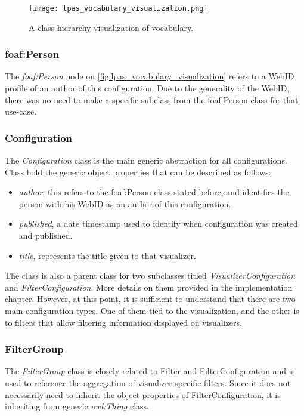 \begin{figure}[h]
\centering
\texttt{[image: lpas\_vocabulary\_visualization.png]}
\caption{A class hierarchy visualization of \lpa{} vocabulary.}
\label{fig:lpas_vocabulary_visualization}
\end{figure}

\subsubsection{foaf:Person}

The \textit{foaf:Person} node on \autoref{fig:lpas_vocabulary_visualization} refers to a WebID profile of an author of this configuration. Due to the generality of the WebID, there was no need to make a specific subclass from the foaf:Person class for that use-case.

\subsubsection{Configuration}

The \textit{Configuration} class is the main generic abstraction for all \lpa{} configurations. Class hold the generic object properties that can be described as follows:
\begin{itemize}
	\item \textit{author}, this refers to the foaf:Person class stated before, and identifies the person with his WebID as an author of this \lpa{} configuration.
	\item \textit{published}, a date timestamp used to identify when configuration was created and published.
	\item \textit{title}, represents the title given to that \lpa{} visualizer.
\end{itemize}

The class is also a parent class for two subclasses titled \textit{VisualizerConfiguration} and \textit{FilterConfiguration}. More details on them provided in the implementation chapter. However, at this point, it is sufficient to understand that there are two main configuration types. One of them tied to the visualization, and the other is to filters that allow filtering information displayed on visualizers.

\subsubsection{FilterGroup}

The \textit{FilterGroup} class is closely related to Filter and FilterConfiguration and is used to reference the aggregation of visualizer specific filters. Since it does not necessarily need to inherit the object properties of FilterConfiguration, it is inheriting from generic \textit{owl:Thing} class.

